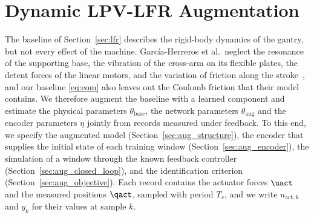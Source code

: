 \section{Dynamic LPV-LFR Augmentation}\label{sec:augmentation}

The baseline of Section~\ref{sec:lfr} describes the rigid-body dynamics of
the gantry, but not every effect of the machine.
Garc\'ia-Herreros et al.\ neglect the resonance of the supporting base, the
vibration of the cross-arm on its flexible plates, the detent forces of the
linear motors, and the variation of friction along the
stroke~\cite[Sec.~2.4]{garcia2013model}, and our baseline \eqref{eq:eom}
also leaves out the Coulomb friction that their model contains.
We therefore augment the baseline with a learned component and estimate the
physical parameters $\theta_{\mathrm{base}}$, the network parameters
$\theta_{\mathrm{aug}}$ and the encoder parameters $\eta$ jointly from
records measured under feedback.
To this end, we specify the augmented model
(Section~\ref{sec:aug_structure}), the encoder that supplies the initial
state of each training window (Section~\ref{sec:aug_encoder}), the
simulation of a window through the known feedback controller
(Section~\ref{sec:aug_closed_loop}), and the identification criterion
(Section~\ref{sec:aug_objective}).
Each record contains the actuator forces $\uact$ and the measured positions
$\qact$, sampled with period $T_s$, and we write $u_{\mathrm{act},k}$ and
$y_k$ for their values at sample $k$.

